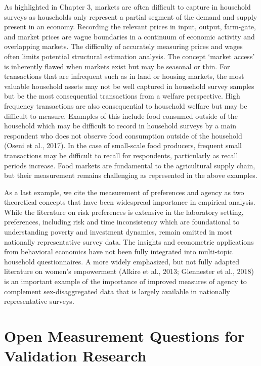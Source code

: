 \documentclass[
]{book}
\begin{document}
As highlighted in Chapter 3, markets are often difficult to capture in household surveys as households only represent a partial segment of the demand and supply present in an economy. Recording the relevant prices in input, output, farm-gate, and market prices are vague boundaries in a continuum of economic activity and overlapping markets. The difficulty of accurately measuring prices and wages often limits potential structural estimation analysis. The concept `market access' is inherently flawed when markets exist but may be seasonal or thin. For transactions that are infrequent such as in land or housing markets, the most valuable household assets may not be well captured in household survey samples but be the most consequential transactions from a welfare perspective. High frequency transactions are also consequential to household welfare but may be difficult to measure. Examples of this include food consumed outside of the household which may be difficult to record in household surveys by a main respondent who does not observe food consumption outside of the household (Oseni et al., 2017). In the case of small-scale food producers, frequent small transactions may be difficult to recall for respondents, particularly as recall periods increase. Food markets are fundamental to the agricultural supply chain, but their measurement remains challenging as represented in the above examples.

As a last example, we cite the measurement of preferences and agency as two theoretical concepts that have been widespread importance in empirical analysis. While the literature on risk preferences is extensive in the laboratory setting, preferences, including risk and time inconsistency which are foundational to understanding poverty and investment dynamics, remain omitted in most nationally representative survey data. The insights and econometric applications from behavioral economics have not been fully integrated into multi-topic household questionnaires. A more widely emphasized, but not fully adapted literature on women's empowerment (Alkire et al., 2013; Glennester et al., 2018) is an important example of the importance of improved measures of agency to complement sex-disaggregated data that is largely available in nationally representative surveys.

\hypertarget{open-measurement-questions-for-validation-research}{%
\section{Open Measurement Questions for Validation Research}\label{open-measurement-questions-for-validation-research}}
\end{document}
